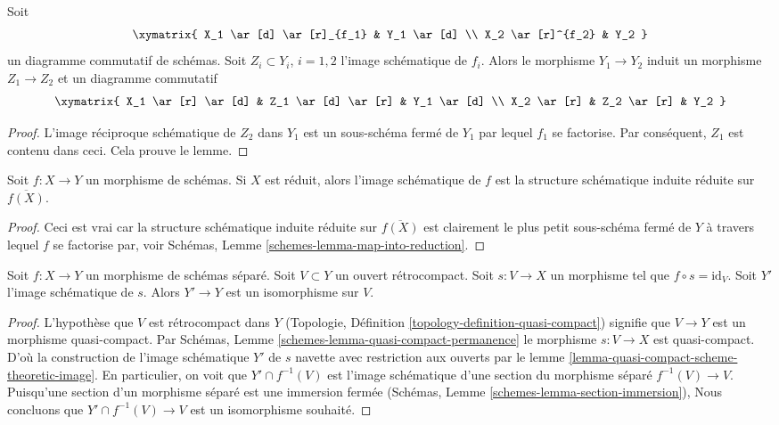 \begin{lemma}
\label{lemma-factor-factor}
Soit
$$
\xymatrix{
X_1 \ar[d] \ar[r]_{f_1} & Y_1 \ar[d] \\
X_2 \ar[r]^{f_2} & Y_2
}
$$
un diagramme commutatif de schémas. Soit $Z_i \subset Y_i$, $i = 1, 2$ l'image
schématique de $f_i$. Alors le morphisme $Y_1 \to Y_2$
induit un morphisme $Z_1 \to Z_2$ et un diagramme
commutatif
$$
\xymatrix{
X_1 \ar[r] \ar[d] & Z_1 \ar[d] \ar[r] & Y_1 \ar[d] \\
X_2 \ar[r] & Z_2 \ar[r] & Y_2
}
$$
\end{lemma}

\begin{proof}
L'image réciproque schématique de $Z_2$ dans $Y_1$ est
un sous-schéma fermé de $Y_1$ par lequel
$f_1$ se factorise. Par conséquent, $Z_1$ est contenu dans
ceci. Cela prouve le lemme.
\end{proof}

\begin{lemma}
\label{lemma-scheme-theoretic-image-reduced}
Soit $f : X \to Y$ un morphisme de schémas. Si $X$
est réduit, alors l'image schématique de $f$ est
la structure schématique induite réduite sur $\overline{f(X)}$.
\end{lemma}

\begin{proof}
Ceci est vrai car la structure schématique induite réduite sur $\overline{f(X)}$ est clairement
le plus petit sous-schéma fermé de $Y$ à travers lequel $f$
se
factorise par, voir Schémas, Lemme \ref{schemes-lemma-map-into-reduction}.
\end{proof}

\begin{lemma}
\label{lemma-scheme-theoretic-image-of-partial-section}
Soit $f : X \to Y$ un morphisme de schémas séparé. Soit
$V \subset Y$ un ouvert rétrocompact. Soit $s : V \to X$ un morphisme
tel que $f \circ s = \text{id}_V$. Soit $Y'$ l'image
schématique de $s$. Alors $Y' \to Y$
est un isomorphisme sur $V$.
\end{lemma}

\begin{proof}
L'hypothèse que $V$ est rétrocompact
dans $Y$ (Topologie, Définition \ref{topology-definition-quasi-compact})
signifie que $V \to Y$ est un morphisme
quasi-compact. Par Schémas, Lemme \ref{schemes-lemma-quasi-compact-permanence} le morphisme
$s : V \to X$ est quasi-compact. D'où
la construction de l'image schématique $Y'$
de $s$ navette avec restriction
aux ouverts par le lemme \ref{lemma-quasi-compact-scheme-theoretic-image}. En particulier,
on voit que $Y' \cap f^{-1}(V)$ est l'image schématique
d'une section du morphisme séparé $f^{-1}(V) \to V$.
Puisqu'une section d'un morphisme séparé
est une immersion fermée
(Schémas, Lemme \ref{schemes-lemma-section-immersion}), Nous concluons
que $Y' \cap f^{-1}(V) \to V$
est un isomorphisme souhaité.
\end{proof}







